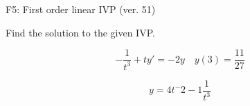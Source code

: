 \begin{exercise}
  \begin{exerciseTitle}F5: First order linear IVP (ver. 51)\end{exerciseTitle}
  \begin{exerciseStatement}
    
Find the solution to the given IVP.

    
\[-\frac{1}{t^{3}} +ty'= -2 y \hspace{1em} y( 3 ) = \frac{11}{27}\]

  \end{exerciseStatement}
  \begin{exerciseAnswer}
    
\[y= 4 t^ -2 -1 \frac{1}{t^{3}}\]

  \end{exerciseAnswer}
\end{exercise}